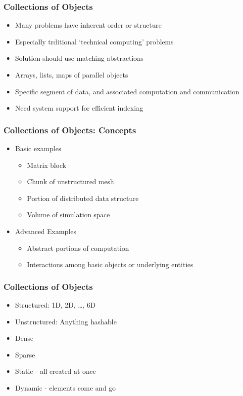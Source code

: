 \begin{frame}[fragile]
  \frametitle{Collections of Objects}
  \begin{itemize}
    \item Many problems have inherent order or structure
    \item Especially trditional `technical computing' problems
    \item Solution should use matching abstractions
    \item Arrays, lists, maps of parallel objects
    \item Specific segment of data, and associated computation and
      communication
    \item Need system support for efficient indexing
  \end{itemize}
\end{frame}

\begin{frame}[fragile]
  \frametitle{Collections of Objects: Concepts}
  \begin{itemize}
    \item Basic examples
      \begin{itemize}
      \item Matrix block
      \item Chunk of unstructured mesh
      \item Portion of distributed data structure
      \item Volume of simulation space
      \end{itemize}
      \pause
    \item Advanced Examples
      \begin{itemize}
      \item Abstract portions of computation
      \item Interactions among basic objects or underlying entities
      \end{itemize}
  \end{itemize}
\end{frame}

\begin{frame}[fragile]
  \frametitle{Collections of Objects}
  \begin{itemize}
    \item Structured: 1D, 2D, \ldots, 6D
    \item Unstructured: Anything hashable
      \pause
    \item Dense
    \item Sparse
      \pause
    \item Static - all created at once
    \item Dynamic - elements come and go
  \end{itemize}
\end{frame}

